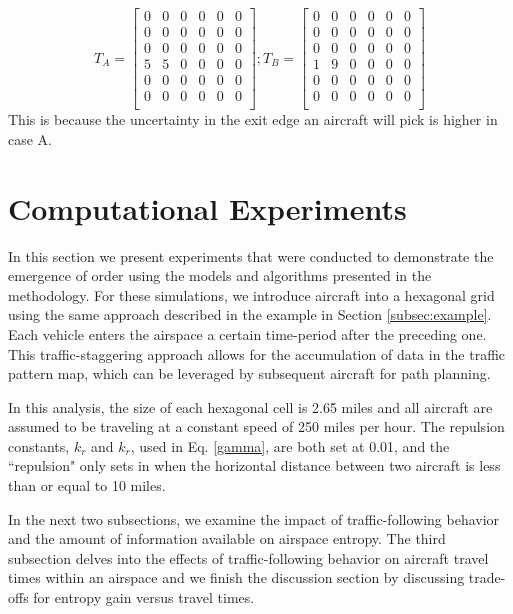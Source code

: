 \documentclass[conference, letter]{IEEEtran}
\begin{document}
$$T_A = \begin{bmatrix}
    0 & 0 & 0 & 0 & 0 & 0\\
    0 & 0 & 0 & 0 & 0 & 0\\
    0 & 0 & 0 & 0 & 0 & 0\\
    5 & 5 & 0 & 0 & 0 & 0\\
    0 & 0 & 0 & 0 & 0 & 0\\
    0 & 0 & 0 & 0 & 0 & 0\\
    \end{bmatrix};
 T_B = \begin{bmatrix}
    0 & 0 & 0 & 0 & 0 & 0\\
    0 & 0 & 0 & 0 & 0 & 0\\
    0 & 0 & 0 & 0 & 0 & 0\\
    1 & 9 & 0 & 0 & 0 & 0\\
    0 & 0 & 0 & 0 & 0 & 0\\
    0 & 0 & 0 & 0 & 0 & 0\\
    \end{bmatrix}
$$
This is because the uncertainty in the exit edge an aircraft will pick is higher in case A. 

\section{Computational Experiments}\label{sec:results}
In this section we present experiments that were conducted to demonstrate the emergence of order using the models and algorithms presented in the methodology. For these simulations, we introduce aircraft into a hexagonal grid using the same approach described in the example in Section \ref{subsec:example}. Each vehicle enters the airspace a certain time-period after the preceding one. This traffic-staggering approach allows for the accumulation of data in the traffic pattern map, which can be leveraged by subsequent aircraft for path planning. 

In this analysis, the size of each hexagonal cell is 2.65 miles and all aircraft are assumed to be traveling at a constant speed of 250 miles per hour. The repulsion constants, $k_r$ and $k_{\dot{r}}$, used in Eq. \ref{gamma}, are both set at 0.01, and the ``repulsion" only sets in when the horizontal distance between two aircraft is less than or equal to 10 miles. 

In the next two subsections, we examine the impact of traffic-following behavior and the amount of information available on airspace entropy. The third subsection delves into the effects of traffic-following behavior on aircraft travel times within an airspace and we finish the discussion section by discussing trade-offs for entropy gain versus travel times. 
\end{document}
